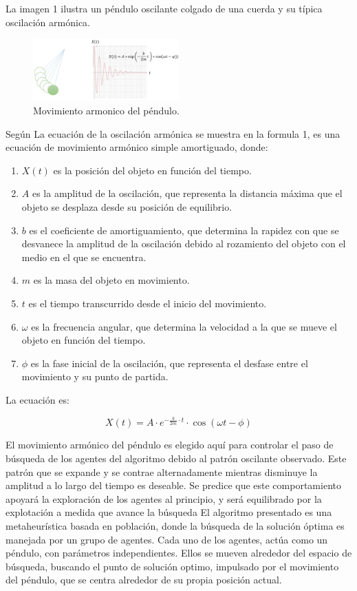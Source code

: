 \documentclass[conference]{IEEEtran}
\begin{document}
La imagen 1 ilustra un péndulo oscilante colgado de una cuerda y su típica
oscilación armónica.
\begin{figure}[h!]
    \centering
    \includegraphics[width=0.5\textwidth, keepaspectratio]{Figures/image1.png}
    \caption{Movimiento armonico del péndulo. \cite{aziz2022}}
    \label{fig:mi_etiqueta}
\end{figure}

Según \cite{aziz2022} La ecuación de la oscilación armónica se muestra en la
formula 1, es una ecuación de movimiento armónico simple amortiguado, donde:

\begin{enumerate}
    \item $X(t)$ es la posición del objeto en función del tiempo.
    \item $A$ es la amplitud de la oscilación, que representa la distancia
          máxima que el objeto se desplaza desde su posición de equilibrio.
    \item $b$ es el coeficiente de amortiguamiento, que determina la rapidez
          con que se desvanece la amplitud de la oscilación debido al
          rozamiento del
          objeto con el medio en el que se encuentra.
    \item $m$ es la masa del objeto en movimiento.
    \item $t$ es el tiempo transcurrido desde el inicio del movimiento.
    \item $\omega$ es la frecuencia angular, que determina la velocidad a la
          que se mueve el objeto en función del tiempo.
    \item $\phi$ es la fase inicial de la oscilación, que representa el desfase
          entre el movimiento y su punto de partida.
\end{enumerate}

La ecuación es:

\begin{equation}
    X(t) = A \cdot e^{-\frac{b}{2m} \cdot t} \cdot \cos(\omega t - \phi)
\end{equation}

El movimiento armónico del péndulo es elegido aquí para controlar el paso de
búsqueda de los agentes del algoritmo debido al patrón oscilante observado.
Este patrón que se expande y se contrae alternadamente mientras disminuye la
amplitud a lo largo del tiempo es deseable. Se predice que este comportamiento
apoyará la exploración de los agentes al principio, y será equilibrado por la
explotación a medida que avance la búsqueda
El algoritmo presentado es una metaheurística basada en población, donde la
búsqueda de la solución óptima es manejada por un grupo de agentes. Cada uno de
los agentes, actúa como un péndulo, con parámetros independientes. Ellos se
mueven alrededor del espacio de búsqueda, buscando el punto de solución optimo,
impulsado por el movimiento del péndulo, que se centra alrededor de su propia
posición actual.
\end{document}
